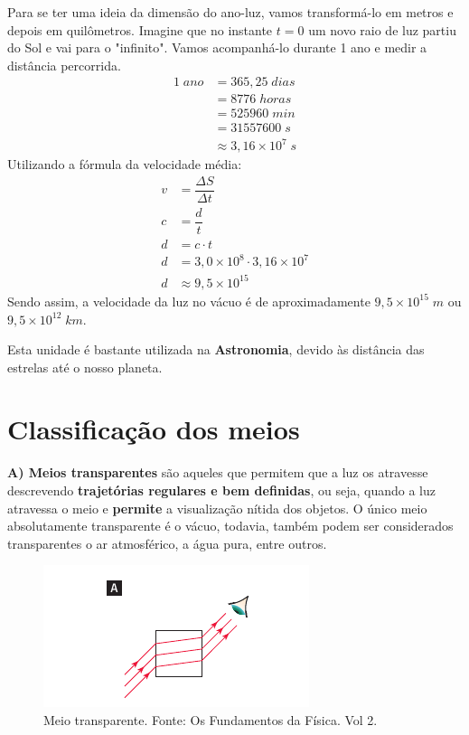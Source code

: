 \documentclass[11pt,twocolumn,oneside]{article}
\begin{document}
Para se ter uma ideia da dimensão do ano-luz, vamos transformá-lo em metros e depois em quilômetros. Imagine que no instante $t=0$ um novo raio de luz partiu do Sol e vai para o "infinito". Vamos acompanhá-lo durante 1 ano e medir a distância percorrida.
\begin{align*}
    1\;ano  &= 365,25\;dias \\
            &= 8776\;horas \\
            &= 525960\;min \\
            &= 31557600\;s \\
            &\approx 3,16\times 10^{7}\;s
\end{align*}
Utilizando a fórmula da velocidade média:
\begin{align*}
    v &= \dfrac{\Delta S}{\Delta t} \\
    c &= \dfrac{d}{t} \\
    d &= c \cdot t \\
    d &= 3,0\times 10^{8} \cdot 3,16\times 10^{7} \\
    d &\approx 9,5 \times 10^{15}
\end{align*}
Sendo assim, a velocidade da luz no vácuo é de aproximadamente $9,5\times 10^{15}\;m$ ou $9,5\times 10^{12}\;km$.


Esta unidade é bastante utilizada na \textbf{Astronomia}, devido às distância das estrelas até o nosso planeta.


\hypertarget{x-classificação-dos-meios}{\section{Classificação dos meios}}
\textbf{A) Meios transparentes} são aqueles que permitem que a luz os atravesse descrevendo \textbf{trajetórias regulares e bem definidas}, ou seja, quando a luz atravessa o meio  e \textbf{permite} a visualização nítida dos objetos. O único meio absolutamente transparente é o vácuo, todavia, também podem ser considerados transparentes o ar atmosférico, a água pura, entre outros.


\begin{figure}[h]{}
\centering\includegraphics[width=2.5truein]{img4.png}
\caption{Meio transparente. Fonte: Os Fundamentos da Física. Vol 2.}
\centering
\end{figure}
\end{document}
